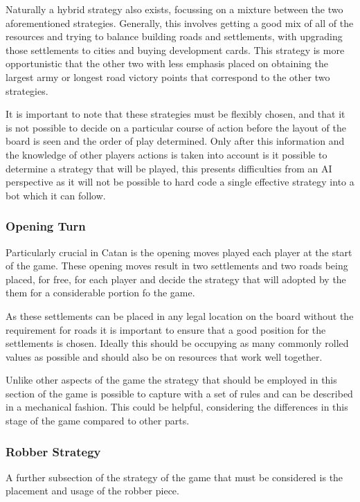 \documentclass[]{article}
\begin{document}
\par Naturally a hybrid strategy also exists, focussing on a mixture between the two aforementioned strategies. Generally, this involves getting a good mix of all of the resources and trying to balance building roads and settlements, with upgrading those settlements to cities and buying development cards. This strategy is more opportunistic that the other two with less emphasis placed on obtaining the largest army or longest road victory points that correspond to the other two strategies. 

\par It is important to note that these strategies must be flexibly chosen, and that it is not possible to decide on a particular course of action before the layout of the board is seen and the order of play determined. Only after this information and the knowledge of other players actions is taken into account is it possible to determine a strategy that will be played, this presents difficulties from an AI perspective as it will not be possible to hard code a single effective strategy into a bot which it can follow.

\subsubsection{Opening Turn}
Particularly crucial in Catan is the opening moves played each player at the start of the game. These opening moves result in two settlements and two roads being placed, for free, for each player and decide the strategy that will adopted by the them for a considerable portion fo the game. 

\par As these settlements can be placed in any legal location on the board without the requirement for roads it is important to ensure that a good position for the settlements is chosen. Ideally this should be occupying as many commonly rolled values as possible and should also be on resources that work well together.

\par Unlike other aspects of the game the strategy that should be employed in this section of the game is possible to capture with a set of rules and can be described in a mechanical fashion. This could be helpful, considering the differences in this stage of the game compared to other parts.

\subsubsection{Robber Strategy}
A further subsection of the strategy of the game that must be considered is the placement and usage of the robber piece. 
\end{document}
